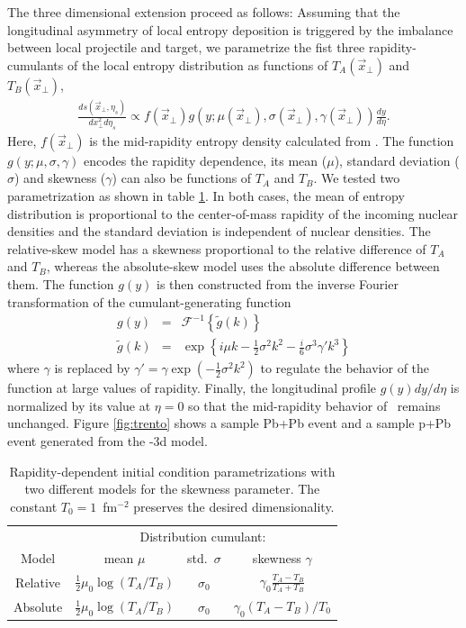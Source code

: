 \documentclass[3p,times,twocolumn]{elsarticle}
\begin{document}
The three dimensional extension proceed as  follows: 
Assuming that the longitudinal asymmetry of local entropy deposition is triggered by the imbalance between local projectile and target, we parametrize the fist three rapidity-cumulants of the local entropy distribution as functions of $T_A(\vec{x}_{\perp})$ and $T_B(\vec{x}_{\perp})$,
\begin{eqnarray}
\frac{ds(\vec{x}_{\perp}, \eta_s)}{dx_{\perp}^2 d\eta_s} \propto f(\vec{x}_{\perp})g(y; \mu(\vec{x}_{\perp}), \sigma(\vec{x}_{\perp}), \gamma(\vec{x}_{\perp}))\frac{dy}{d\eta}.
\end{eqnarray}
Here, $f(\vec{x}_{\perp})$ is the  mid-rapidity entropy density calculated from  \trento. The function $g(y; \mu, \sigma, \gamma)$ encodes the rapidity dependence,  its mean ($\mu$), standard deviation ($\sigma$) and skewness ($\gamma$) can also be functions of $T_A$ and $T_B$.
We tested two parametrization as shown in table \ref{tab:parametrization}.
In both cases, the mean of entropy distribution is proportional to the center-of-mass rapidity of the incoming nuclear densities and the standard deviation is independent of nuclear densities. 
The relative-skew model has a skewness proportional to the relative difference of $T_A$ and $T_B$, whereas the absolute-skew model uses the absolute difference between them.
The function $g(y)$ is then constructed from the inverse Fourier transformation of the cumulant-generating function
\begin{eqnarray}
g(y) &=& \mathcal{F}^{-1}\left\lbrace\tilde{g}(k)\right\rbrace \\
\tilde{g}(k) &=& \exp \left\lbrace i\mu k - \frac{1}{2}\sigma^2 k^2 - \frac{i}{6}\sigma^3 \gamma'k^3\right\rbrace
\end{eqnarray}
where $\gamma$ is replaced by $\gamma' = \gamma\exp(-\frac{1}{2}\sigma^2k^2)$ to regulate the behavior of the function at large values of rapidity.
Finally, the longitudinal profile $g(y)dy/d\eta$ is normalized by its value at $\eta=0$ so that the mid-rapidity behavior of \trento~remains unchanged.
Figure \ref{fig:trento} shows a sample Pb+Pb event and a sample p+Pb event generated from the \trento-3d model.

\begin{table}
  \caption{
    \label{tab:parametrization}
    Rapidity-dependent initial condition parametrizations with two different models for the skewness parameter. The constant $T_0 = 1$~fm$^{-2}$ preserves the desired dimensionality.
  }
  \begin{tabular}{cccc}
\hline\hline
      & \multicolumn{3}{c}{Distribution cumulant:} \\
      Model & \multicolumn{1}{c}{mean $\mu$} & \multicolumn{1}{c}{std.\ $\sigma$} & \multicolumn{1}{c}{skewness $\gamma$} \\
\hline
        Relative  & $\frac{1}{2} \mu_0 \log(T_A/T_B)$ & $\sigma_0$ & $\gamma_0 \frac{T_A - T_B}{T_A + T_B}$ \smallskip \\
        Absolute & $\frac{1}{2} \mu_0 \log(T_A/T_B)$  & $\sigma_0$ & $\gamma_0 (T_A - T_B)/T_0$ \\
\hline\hline
  \end{tabular}
\end{table}
\end{document}
